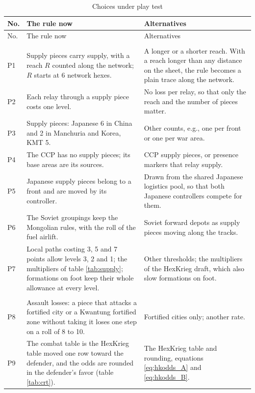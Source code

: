 \documentclass[11pt]{article}
\begin{document}
{\footnotesize
\begin{longtable}{@{}>{\raggedright\arraybackslash}p{}>{\raggedright\arraybackslash}p{}>{\raggedright\arraybackslash}p{}@{}}
\caption{Choices under play test}\label{tab:choices}\\
\toprule
No. & The rule now & Alternatives \\
\midrule
\endfirsthead
\toprule
No. & The rule now & Alternatives \\
\midrule
\endhead
\bottomrule
\endfoot
\multicolumn{3}{@{}l}{\textbf{Supply} (section \ref{sub:supply})} \\
P1 & Supply pieces carry supply, with a reach $R$ counted along the network; $R$ starts at 6 network hexes. & A longer or a shorter reach. With a reach longer than any distance on the sheet, the rule becomes a plain trace along the network. \\
P2 & Each relay through a supply piece costs one level. & No loss per relay, so that only the reach and the number of pieces matter. \\
P3 & Supply pieces: Japanese 6 in China and 2 in Manchuria and Korea, KMT 5. & Other counts, e.g., one per front or one per war area. \\
P4 & The CCP has no supply pieces; its base areas are its sources. & CCP supply pieces, or presence markers that relay supply. \\
P5 & Japanese supply pieces belong to a front and are moved by its controller. & Drawn from the shared Japanese logistics pool, so that both Japanese controllers compete for them. \\
P6 & The Soviet groupings keep the Mongolian rules, with the roll of the fuel airlift. & Soviet forward depots as supply pieces moving along the tracks. \\
P7 & Local paths costing 3, 5 and 7 points allow levels 3, 2 and 1; the multipliers of table \ref{tab:supply}; formations on foot keep their whole allowance at every level. & Other thresholds; the multipliers of the HexKrieg draft, which also slow formations on foot. \\
\multicolumn{3}{@{}l}{\textbf{Combat} (section \ref{sub:combat})} \\
P8 & Assault losses: a piece that attacks a fortified city or a Kwantung fortified zone without taking it loses one step on a roll of 8 to 10. & Fortified cities only; another rate. \\
P9 & The combat table is the HexKrieg table moved one row toward the defender, and the odds are rounded in the defender's favor (table \ref{tab:crt}). & The HexKrieg table and rounding, equations \eqref{eq:hkodds_A} and \eqref{eq:hkodds_B}. \\

\end{longtable}}
\end{document}
